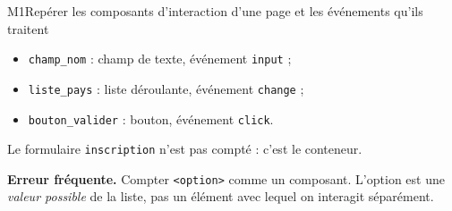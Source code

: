 \begin{fichemethode}{M1}{Repérer les composants d'interaction d'une page et les événements qu'ils traitent}
\begin{itemize}
  \item \lstinline{champ_nom} : champ de texte, événement \lstinline{input} ;
  \item \lstinline{liste_pays} : liste déroulante, événement \lstinline{change} ;
  \item \lstinline{bouton_valider} : bouton, événement \lstinline{click}.
\end{itemize}

Le formulaire \lstinline{inscription} n'est pas compté : c'est le conteneur.

\textbf{Erreur fréquente.} Compter \lstinline{<option>} comme un composant. L'option est une
\emph{valeur possible} de la liste, pas un élément avec lequel on interagit séparément.

\end{fichemethode}
